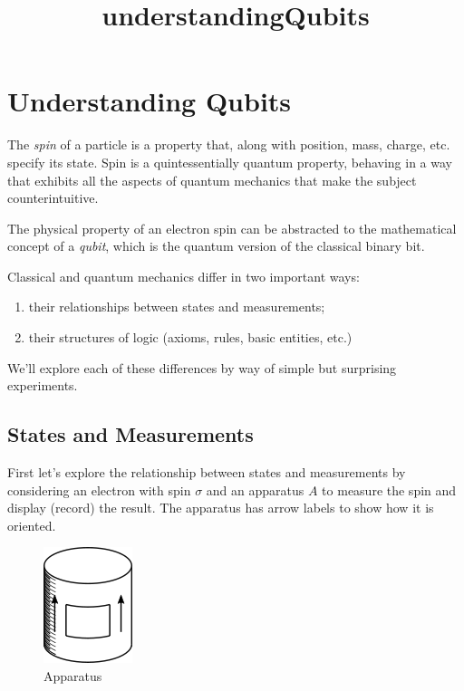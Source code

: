 \documentclass[11pt]{article}
\title{understandingQubits}
\makeatletter
\def\maxwidth{\ifdim\Gin@nat@width>\linewidth\linewidth
    \else\Gin@nat@width\fi}
\let\Oldincludegraphics\includegraphics
\renewcommand{\includegraphics}[1]{\Oldincludegraphics[width=.8\maxwidth]{#1}}
\providecommand{\tightlist}{%
      \setlength{\itemsep}{0pt}\setlength{\parskip}{0pt}}
\makeatother
\begin{document}
    
    
    \maketitle
    
    

    
    \hypertarget{understanding-qubits}{%
\section{Understanding Qubits}\label{understanding-qubits}}

The \emph{spin} of a particle is a property that, along with position,
mass, charge, etc. specify its state. Spin is a quintessentially quantum
property, behaving in a way that exhibits all the aspects of quantum
mechanics that make the subject counterintuitive.

The physical property of an electron spin can be abstracted to the
mathematical concept of a \emph{qubit}, which is the quantum version of
the classical binary bit.

Classical and quantum mechanics differ in two important ways:

\begin{enumerate}
\def\labelenumi{\arabic{enumi}.}
\tightlist
\item
  their relationships between states and measurements;
\item
  their structures of logic (axioms, rules, basic entities, etc.)
\end{enumerate}

We'll explore each of these differences by way of simple but surprising
experiments.

    \hypertarget{states-and-measurements}{%
\subsection{States and Measurements}\label{states-and-measurements}}

First let's explore the relationship between states and measurements by
considering an electron with spin \(\sigma\) and an apparatus \(A\) to
measure the spin and display (record) the result. The apparatus has
arrow labels to show how it is oriented.

\begin{figure}
\centering
\includegraphics{img/statesAndMeasurements_00.png}
\caption{Apparatus}
\end{figure}
\end{document}
